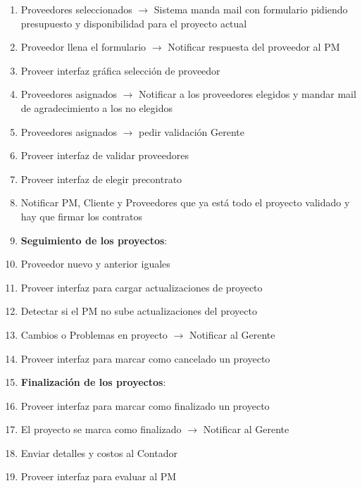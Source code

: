 \begin{enumerate}
	\item Proveedores seleccionados $\rightarrow$ Sistema manda mail con formulario pidiendo presupuesto y disponibilidad para el proyecto actual
	\item Proveedor llena el formulario $\rightarrow$ Notificar respuesta del proveedor al PM	
	\item Proveer interfaz gráfica selección de proveedor
	\item Proveedores asignados $\rightarrow$ Notificar a los proveedores elegidos y mandar mail de agradecimiento a los no elegidos
	\item Proveedores asignados $\rightarrow$ pedir validación Gerente
	\item Proveer interfaz de validar proveedores
	\item Proveer interfaz de elegir precontrato
	\item Notificar PM, Cliente y Proveedores que ya está todo el proyecto validado y hay que firmar los contratos
	
    \item[] \textbf{Seguimiento de los proyectos}:

	\item Proveedor nuevo y anterior iguales
	\item Proveer interfaz para cargar actualizaciones de proyecto
	\item Detectar si el PM no sube actualizaciones del proyecto
	\item Cambios o Problemas en proyecto $\rightarrow$ Notificar al Gerente
	\item Proveer interfaz para marcar como cancelado un proyecto
	
    \item[] \textbf{Finalización de los proyectos}:

	\item Proveer interfaz para marcar como finalizado un proyecto
	\item El proyecto se marca como finalizado $\rightarrow$ Notificar al Gerente
	\item Enviar detalles y costos al Contador
	\item Proveer interfaz para evaluar al PM
	
	
\end{enumerate}
